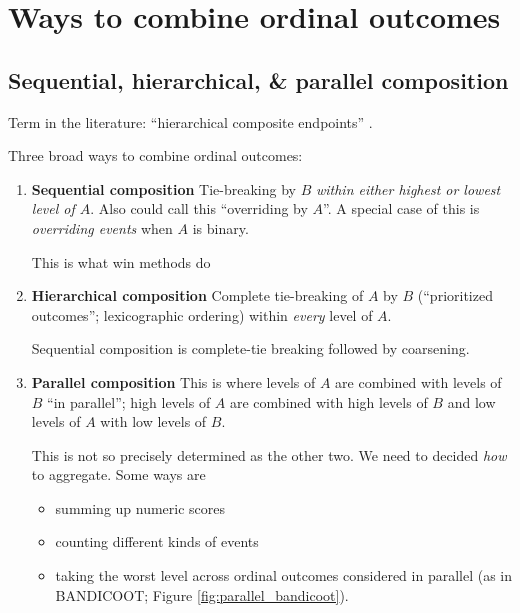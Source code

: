 \documentclass[
  11pt,
  fleqn
]{article}
\begin{document}
\section{Ways to combine ordinal outcomes}

\subsection{Sequential,
hierarchical, \& parallel composition}

Term in the literature: ``hierarchical composite endpoints''
\citep{gasparyanDesignAnalysisStudies2022}.

Three broad ways to combine ordinal outcomes:
\begin{enumerate}
  \item \textbf{Sequential composition} Tie-breaking by $B$
    \emph{within either highest or lowest level of $A$}. Also could
    call this ``overriding by $A$''. A special case of this is
    \emph{overriding events} when $A$ is binary.

    This is what win methods do 
  \item \textbf{Hierarchical composition} Complete tie-breaking of $A$ by
    $B$ (``prioritized outcomes''; lexicographic ordering) within
    \emph{every} level of $A$.

    Sequential composition is complete-tie breaking followed by coarsening.

  \item \textbf{Parallel composition} This is where levels of $A$ are
    combined with levels of $B$ ``in parallel''; high levels of $A$
    are combined with high levels of $B$ and low levels of $A$ with
    low levels of $B$.

    This is not so precisely determined as the other two. We need to
    decided \emph{how} to aggregate. Some ways are
    \begin{itemize}
      \item summing up numeric
        scores
      \item counting different kinds of events
      \item taking the worst level across ordinal outcomes considered
        in parallel (as in BANDICOOT; Figure \ref{fig:parallel_bandicoot}).
    \end{itemize}
\end{enumerate}
\end{document}
